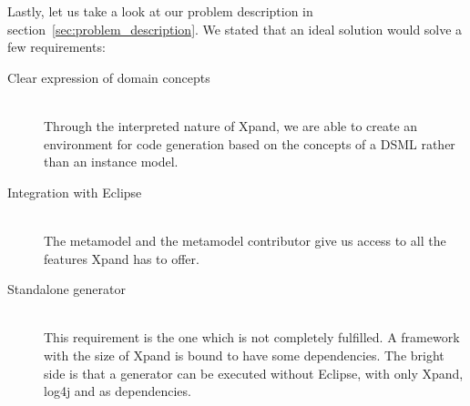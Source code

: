 Lastly, let us take a look at our problem description in section~\ref{sec:problem_description}. We stated that an ideal solution would solve a few requirements:
\begin{description}
  \item[Clear expression of domain concepts] \hfill \\
  Through the interpreted nature of Xpand, we are able to create an environment for code generation based on the concepts of a DSML rather than an instance model.
  \item[Integration with Eclipse] \hfill \\
  The metamodel and the metamodel contributor give us access to all the features Xpand has to offer.
  \item[Standalone generator] \hfill \\
  This requirement is the one which is not completely fulfilled. A framework with the size of Xpand is bound to have some dependencies. The bright side is that a generator can be executed without Eclipse, with only Xpand, log4j and  as dependencies.
\end{description}
  





